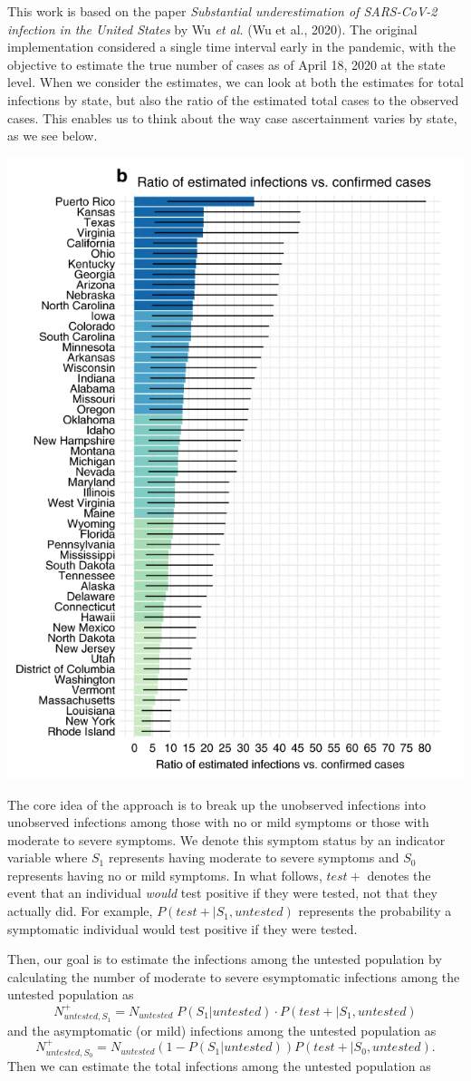 \documentclass[12pt,twoside]{smiththesis}
\begin{document}
This work is based on the paper \emph{Substantial underestimation of SARS-CoV-2 infection in the United States} by Wu \emph{et al.} (Wu et al., 2020). The original implementation considered a single time interval early in the pandemic, with the objective to estimate the true number of cases as of April 18, 2020 at the state level. When we consider the estimates, we can look at both the estimates for total infections by state, but also the ratio of the estimated total cases to the observed cases. This enables us to think about the way case ascertainment varies by state, as we see below.

\includegraphics[width=0.5\linewidth]{./figure/figure_original_case_ratio}

The core idea of the approach is to break up the unobserved infections into unobserved infections among those with no or mild symptoms or those with moderate to severe symptoms. We denote this symptom status by an indicator variable where \(S_1\) represents having moderate to severe symptoms and \(S_0\) represents having no or mild symptoms. In what follows, \(test +\) denotes the event that an individual \emph{would} test positive if they were tested, not that they actually did. For example, \(P(test+|S_1,untested)\) represents the probability a symptomatic individual would test positive if they were tested.

Then, our goal is to estimate the infections among the untested population by calculating the number of moderate to severe esymptomatic infections among the untested population as
\[N^+_{untested,S_1} = N_{untested} \; P(S_1|untested) \cdot P(test + | S_1,untested)\]
and the asymptomatic (or mild) infections among the untested population as
\[N^+_{untested,S_0} = N_{untested}(1-P(S_1|untested))P(test + | S_0,untested).\]
Then we can estimate the total infections among the untested population as
\end{document}
